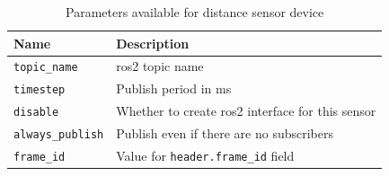 \begin{table}[H]
    \centering
    \begin{tabular}{|l|l|}
        \hline
        \textbf{Name} & \textbf{Description} \\
        \hline
        \texttt{topic\_name} & \ac{ros2} topic name \\
        \hline
        \texttt{timestep} & Publish period in ms  \\
        \hline
        \texttt{disable} & Whether to create \ac{ros2} interface for this sensor \\
        \hline
        \texttt{always\_publish} & Publish even if there are no subscribers \\
        \hline
        \texttt{frame\_id} & Value for \texttt{header.frame\_id} field \\
        \hline
    \end{tabular}
    \caption{Parameters available for distance sensor device}
    \label{tab:generalization:distance_params}
\end{table}

